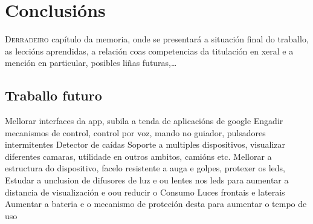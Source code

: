 \chapter{Conclusións}
\label{chap:conclusions}

\lettrine{D}{erradeiro} capítulo da memoria, onde se presentará a
situación final do traballo, as leccións aprendidas, a relación coas
competencias da titulación en xeral e a mención en particular,
posibles liñas futuras,\dots
\section{Traballo futuro}
Mellorar interfaces da app, subila a tenda de aplicacións de google
Engadir mecanismos de control, control por voz, mando no guiador, pulsadores intermitentes
Detector de caídas
Soporte a multiples dispositivos, visualizar diferentes camaras, utilidade en outros ambitos, camións etc.
Mellorar a estructura do dispositivo, facelo resistente a auga e golpes, protexer os leds,
Estudar a unclusion de difusores de luz e ou lentes nos leds para aumentar a distancia de visualización e oou reducir o Consumo
Luces frontais e laterais
Aumentar a bateria e o mecanismo de proteción desta para aumentar o tempo de uso
